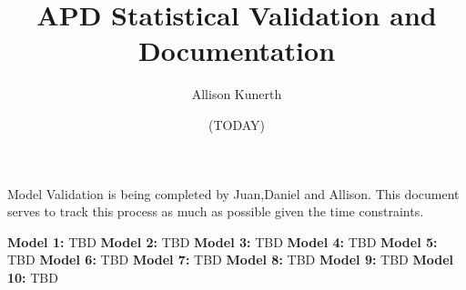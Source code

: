 \documentclass[12pt, letterpaper]{article}
\title{APD Statistical Validation and Documentation}
\author{Allison Kunerth}
\date{(TODAY)}
\begin{document}
\maketitle

Model Validation is being completed by Juan,Daniel and Allison. This document serves to track this process as much as possible given the time constraints.

\textbf{Model 1:} 
TBD
\textbf{Model 2:}
TBD
\textbf{Model 3:}
TBD
\textbf {Model 4:} 
TBD
\textbf{Model 5:} 
TBD
\textbf{Model 6:} 
TBD
\textbf{Model 7:}
TBD
\textbf{Model 8:} 
TBD
\textbf{Model 9:} 
TBD
\textbf{Model 10:} 
TBD
\end{document}
